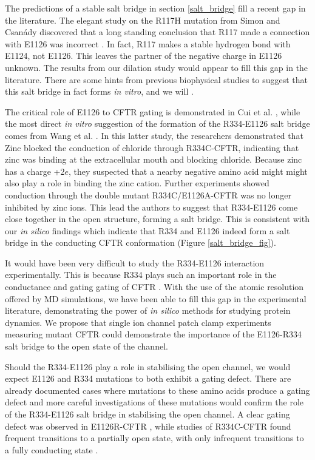The predictions of a stable salt bridge in section \ref{salt_bridge} fill a recent gap in the literature. The elegant study on the R117H mutation from Simon and Csanády \cite{simon2021} discovered that a long standing conclusion that R117 made a connection with E1126 was incorrect \cite{cui2014}. In fact, R117 makes a stable hydrogen bond with E1124, not E1126. This leaves the partner of the negative charge in E1126 unknown. The results from our dilation study would appear to fill this gap in the literature. There are some hints from previous biophysical studies to suggest that this salt bridge in fact forms \textit {in vitro}, and we will .

The critical role of E1126 to CFTR gating is demonstrated in Cui et al. \cite{cui2014}, while the most direct \textit{in vitro} suggestion of the formation of the R334-E1126 salt bridge comes from Wang et al. \cite{wang2016}. In this latter study, the researchers demonstrated that Zinc blocked the conduction of chloride through R334C-CFTR, indicating that zinc was binding at the extracellular mouth and blocking chloride. Because zinc has a charge +2$e$, they suspected that a nearby negative amino acid might might also play a role in binding the zinc cation. Further experiments showed conduction through the double mutant R334C/E1126A-CFTR was no longer inhibited by zinc ions. This lead the authors to suggest that R334-E1126 come close together in the open structure, forming a salt bridge. This is consistent with our \textit{in silico} findings which indicate that R334 and E1126 indeed form a salt bridge in the conducting CFTR conformation (Figure \ref{salt_bridge_fig}).  

It would have been very difficult to study the R334-E1126 interaction experimentally. This is because R334 plays such an important role in the conductance and gating gating of CFTR \cite{zhang2005,zhang2005a, gong2004, wang2012}. With the use of the atomic resolution offered by MD simulations, we have been able to fill this gap in the experimental literature, demonstrating the power of \textit {in silico} methods for studying protein dynamics. We propose that single ion channel patch clamp experiments measuring mutant CFTR could demonstrate the importance of the E1126-R334 salt bridge to the open state of the channel. 

Should the R334-E1126 play a role in stabilising the open channel, we would expect E1126 and R334 mutations to both exhibit a gating defect. There are already documented cases where mutations to these amino acids produce a gating defect and more careful investigations of these mutations would confirm the role of the R334-E1126 salt bridge in stabilising the open channel. A clear gating defect was observed in E1126R-CFTR \cite{cui2014}, while studies of R334C-CFTR found frequent transitions to a partially open state, with only infrequent transitions to a fully conducting state \cite{zhang2005a}. 

